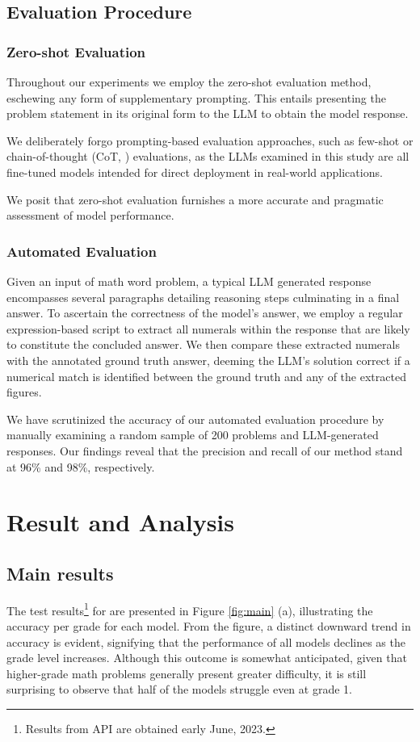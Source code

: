 \subsection{Evaluation Procedure}
\subsubsection{Zero-shot Evaluation} Throughout our experiments we employ the zero-shot evaluation method, eschewing any form of supplementary prompting. This entails presenting the problem statement in its original form to the LLM to obtain the model response. 

We deliberately forgo prompting-based evaluation approaches, such as few-shot or chain-of-thought (CoT, \citet{cot}) evaluations, as the LLMs examined in this study are all fine-tuned models intended for direct deployment in real-world applications.

We posit that zero-shot evaluation furnishes a more accurate and pragmatic assessment of model performance.

\subsubsection{Automated Evaluation} Given an input of math word problem, a typical LLM generated response encompasses several paragraphs detailing reasoning steps culminating in a final answer. To ascertain the correctness of the model's answer, we employ a regular expression-based script to extract all numerals within the response that are likely to constitute the concluded answer. We then compare these extracted numerals with the annotated ground truth answer, deeming the LLM's solution correct if a numerical match is identified between the ground truth and any of the extracted figures.

We have scrutinized the accuracy of our automated evaluation procedure by manually examining a random sample of 200 problems and LLM-generated responses. Our findings reveal that the precision and recall of our method stand at 96\% and 98\%, respectively. 

\section{Result and Analysis}
\subsection{Main results} The test results\footnote{Results from API are obtained early June, 2023.} for are presented in Figure \ref{fig:main} (a), illustrating the accuracy per grade for each model. From the figure, a distinct downward trend in accuracy is evident, signifying that the performance of all models declines as the grade level increases. Although this outcome is somewhat anticipated, given that higher-grade math problems generally present greater difficulty,  it is still surprising to observe that half of the models struggle even at grade 1. 


